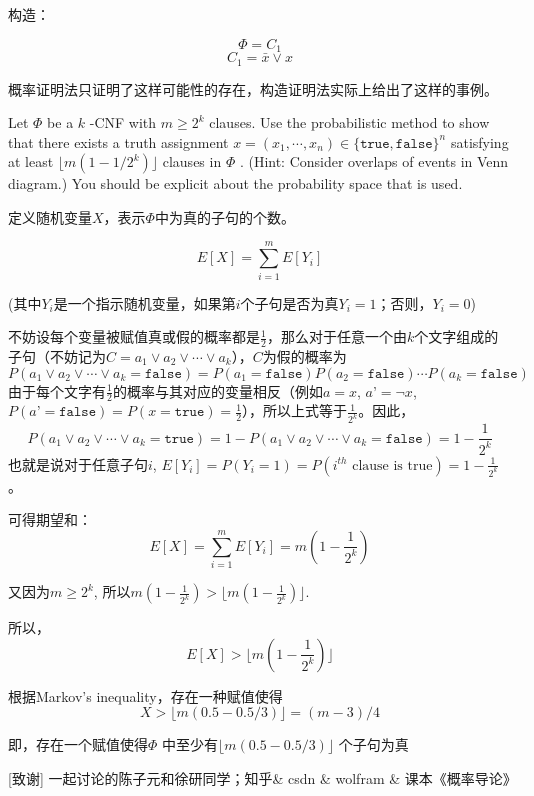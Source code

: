 \documentclass[12pt, a4paper, oneside]{ctexart}
\begin{document}
\begin{solution}
  构造：

  $$\Phi = C_1$$
  $$C_1 = \bar{x} \vee x$$

  概率证明法只证明了这样可能性的存在，构造证明法实际上给出了这样的事例。
\end{solution}
\begin{problem}
 Let $\Phi$
be a $k$
-CNF with $\displaystyle{ m\geq 2^k }$
clauses. Use the probabilistic method to show that there exists a truth assignment $\displaystyle{ x=(x_1,\cdots, x_n)\in \{\mathtt{true},\mathtt{false}\}^n }$
satisfying at least $\displaystyle{ \lfloor m(1-1/2^k) \rfloor }$
clauses in $\Phi$
. (Hint: Consider overlaps of events in Venn diagram.) You should be explicit about the probability space that is used.
\end{problem}
\begin{solution}
  定义随机变量$X$，表示$\Phi$中为真的子句的个数。


  $$ E[X]=\sum_{i=1}^m E[Y_i] $$

  (其中$Y_i$是一个指示随机变量，如果第$i$个子句是否为真$Y_i=1$；否则，$Y_i=0$)

  不妨设每个变量被赋值真或假的概率都是$\frac{1}{2}$，那么对于任意一个由$k$个文字组成的子句（不妨记为$C=a_1\vee a_2\vee \cdots \vee a_k$），$C$为假的概率为
  $$ P(a_1\vee a_2\vee \cdots \vee a_k=\mathtt{false})=P(a_1=\mathtt{false})P(a_2=\mathtt{false})\cdots P(a_k=\mathtt{false}) $$
  由于每个文字有$\frac{1}{2}$的概率与其对应的变量相反（例如$a=x$, $a’=\neg x$, $P(a’=\mathtt{false})=P(x=\mathtt{true})=\frac{1}{2}$），所以上式等于$\frac{1}{2^k}$。因此， $$ P(a_1\vee a_2\vee \cdots \vee a_k=\mathtt{true})=1-P(a_1\vee a_2\vee \cdots \vee a_k=\mathtt{false})=1-\frac{1}{2^k} $$
  也就是说对于任意子句$i$, $E[Y_i]=P(Y_i=1)=P(\text{$i^{th}$ clause is true})= 1-\frac{1}{2^k}$。

  可得期望和：
  $$ E[X]=\sum_{i=1}^m E[Y_i]=m( 1-\frac{1}{2^k}) $$

  又因为$m\geq 2^k$, 所以$m( 1-\frac{1}{2^k})>\lfloor m( 1-\frac{1}{2^k}) \rfloor$.

  所以， $$ E[X]> \lfloor m( 1-\frac{1}{2^k}) \rfloor $$

  根据Markov’s inequality，存在一种赋值使得 $$ X> \lfloor m( 0.5-0.5/3) \rfloor = (m-3)/4 $$

  即，存在一个赋值使得$\Phi$ 中至少有$\lfloor m(0.5-0.5/3) \rfloor$ 个子句为真
\end{solution}

[致谢]
一起讨论的陈子元和徐研同学；知乎\& csdn \& wolfram \& 课本《概率导论》
\end{document}
